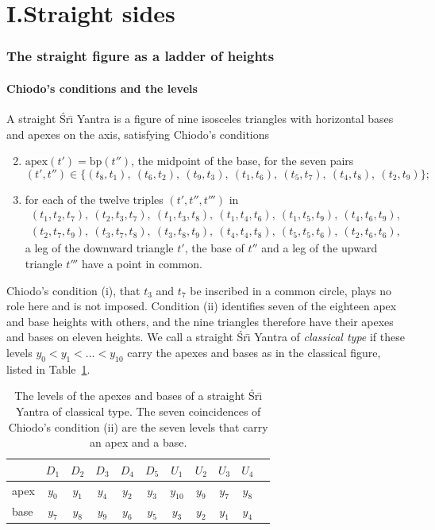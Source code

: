 \documentclass[11pt,a4paper]{article}
\theoremstyle{definition}
\theoremstyle{remark}
\newcommand{\Sri}{\'Sr\={\i}}
\begin{document}
\part*{I.\quad Straight sides}

\section{The straight figure as a ladder of heights}\label{sec:straight}

\subsection{Chiodo's conditions and the levels}
A straight \Sri{} Yantra is a figure of nine isosceles triangles with horizontal bases and apexes on the
axis, satisfying Chiodo's conditions
\begin{enumerate}[label=(\roman*),leftmargin=2.5em]
\setcounter{enumi}{1}
\item $\mathrm{apex}(t') = \mathrm{bp}(t'')$, the midpoint of the base, for the seven pairs
\[
(t',t'') \in \{(t_8,t_1),\ (t_6,t_2),\ (t_9,t_3),\ (t_1,t_6),\ (t_5,t_7),\ (t_4,t_8),\ (t_2,t_9)\};
\]
\item for each of the twelve triples $(t',t'',t''')$ in
\[
\begin{gathered}
(t_1,t_2,t_7),\ (t_2,t_3,t_7),\ (t_1,t_3,t_8),\ (t_1,t_4,t_6),\ (t_1,t_5,t_9),\ (t_4,t_6,t_9),\\
(t_2,t_7,t_9),\ (t_3,t_7,t_8),\ (t_3,t_8,t_9),\ (t_4,t_4,t_8),\ (t_5,t_5,t_6),\ (t_2,t_6,t_6),
\end{gathered}
\]
a leg of the downward triangle $t'$, the base of $t''$ and a leg of the upward triangle $t'''$ have a
point in common.
\end{enumerate}
Chiodo's condition (i), that $t_3$ and $t_7$ be inscribed in a common circle, plays no role here and is
not imposed. Condition (ii) identifies seven of the eighteen apex and base heights with others, and the
nine triangles therefore have their apexes and bases on eleven heights. We call a straight
\Sri{} Yantra of \emph{classical type} if these levels $y_0 < y_1 < \dots < y_{10}$ carry the apexes and
bases as in the classical figure, listed in Table~\ref{tab:levels}.

\begin{table}[h]
\centering\small
\begin{tabular}{@{}lcccccccccc@{}}
\toprule
& $D_1$ & $D_2$ & $D_3$ & $D_4$ & $D_5$ & $U_1$ & $U_2$ & $U_3$ & $U_4$ \\ \midrule
apex & $y_0$ & $y_1$ & $y_4$ & $y_2$ & $y_3$ & $y_{10}$ & $y_9$ & $y_7$ & $y_8$ \\
base & $y_7$ & $y_8$ & $y_9$ & $y_6$ & $y_5$ & $y_3$ & $y_2$ & $y_1$ & $y_4$ \\ \bottomrule
\end{tabular}
\caption{The levels of the apexes and bases of a straight \Sri{} Yantra of classical type. The seven
coincidences of Chiodo's condition (ii) are the seven levels that carry an apex and a base.}
\label{tab:levels}
\end{table}
\end{document}
